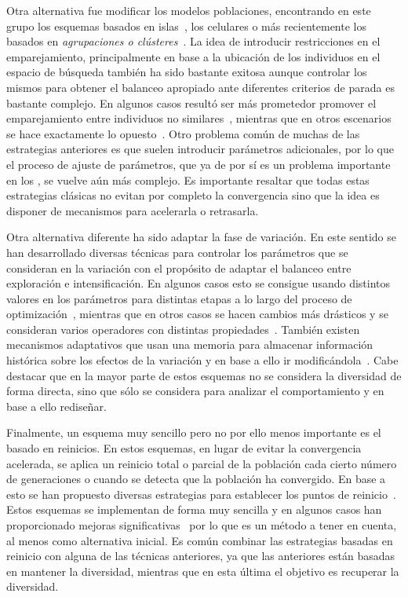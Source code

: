 Otra alternativa fue modificar los modelos poblaciones, encontrando en este grupo los esquemas basados en islas~\cite{alba2005parallel}, los celulares
o más recientemente los basados en \textit{agrupaciones o clústeres}~\cite{gao2014cluster}.
%
La idea de introducir restricciones en el emparejamiento, principalmente en base a la ubicación de los individuos en el espacio de búsqueda también
ha sido bastante exitosa aunque controlar los mismos para obtener el balanceo apropiado ante diferentes criterios de parada
es bastante complejo.
%
En algunos casos resultó ser más prometedor promover el emparejamiento entre individuos no similares~\cite{Joel:CHC}, mientras que en otros escenarios 
se hace exactamente lo opuesto~\cite{deb1989investigation}.
%
Otro problema común de muchas de las estrategias anteriores es que suelen introducir parámetros adicionales, por lo que el proceso de ajuste de parámetros, que ya de por sí
es un problema importante en los \EAS{}, se vuelve aún más complejo.
%
Es importante resaltar que todas estas estrategias clásicas no evitan por completo la convergencia sino que la idea es disponer de mecanismos para acelerarla o retrasarla.

Otra alternativa diferente ha sido adaptar la fase de variación.
%
En este sentido se han desarrollado diversas técnicas para controlar los parámetros que se consideran en la variación con el propósito de 
adaptar el balanceo entre exploración e intensificación.
%
En algunos casos esto se consigue usando distintos valores en los parámetros para distintas etapas a lo largo del proceso de optimización~\cite{yu2014differential},
mientras que en otros casos se hacen cambios más drásticos y se consideran varios operadores con distintas propiedades~\cite{lobo2007parameter}.
%
También existen mecanismos adaptativos que usan una memoria para almacenar información histórica sobre los efectos de la variación
y en base a ello ir modificándola~\cite{yuen2009genetic}.
%
Cabe destacar que en la mayor parte de estos esquemas no se considera la diversidad de forma directa, sino que sólo se considera para analizar el comportamiento
y en base a ello rediseñar.

Finalmente, un esquema muy sencillo pero no por ello menos importante es el basado en reinicios.
%
En estos esquemas, en lugar de evitar la convergencia acelerada, se aplica un reinicio total o parcial de la población cada cierto número de
generaciones o cuando se detecta que la población ha convergido.
%
En base a esto se han propuesto diversas estrategias para establecer los puntos de reinicio~\cite{jansen2002analysis}.
%
Estos esquemas se implementan de forma muy sencilla y en algunos casos han proporcionado mejoras significativas~\cite{koumousis2006saw} por lo que
es un método a tener en cuenta, al menos como alternativa inicial.
%
Es común combinar las estrategias basadas en reinicio con alguna de las técnicas anteriores, ya que las anteriores están basadas en mantener
la diversidad, mientras que en esta última el objetivo es recuperar la diversidad.

